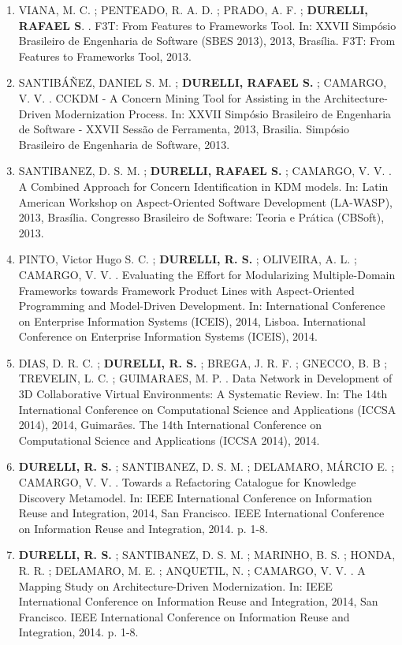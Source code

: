 \documentclass[12pt]{article}
\begin{document}
\begin{itemize}
\begin{enumerate}
		\item VIANA, M. C. ; PENTEADO, R. A. D. ; PRADO, A. F. ; \textbf{DURELLI, RAFAEL S}. . F3T: From Features to Frameworks Tool. In: XXVII Simpósio Brasileiro de Engenharia de Software (SBES 2013), 2013, Brasília. F3T: From Features to Frameworks Tool, 2013.
		
		\item SANTIBÁÑEZ, DANIEL S. M. ; \textbf{DURELLI, RAFAEL S.} ; CAMARGO, V. V. . CCKDM - A Concern Mining Tool for Assisting in the Architecture-Driven Modernization Process. In: XXVII Simpósio Brasileiro de Engenharia de Software - XXVII Sessão de Ferramenta, 2013, Brasilia. Simpósio Brasileiro de Engenharia de Software, 2013.
		
		\item SANTIBANEZ, D. S. M. ; \textbf{DURELLI, RAFAEL S.} ; CAMARGO, V. V. . A Combined Approach for Concern Identification in KDM models. In: Latin American Workshop on Aspect-Oriented Software Development (LA-WASP), 2013, Brasília. Congresso Brasileiro de Software: Teoria e Prática (CBSoft), 2013.
		
		\item PINTO, Victor Hugo S. C. ; \textbf{DURELLI, R. S.} ; OLIVEIRA, A. L. ; CAMARGO, V. V. . Evaluating the Effort for Modularizing Multiple-Domain Frameworks towards Framework Product Lines with Aspect-Oriented Programming and Model-Driven Development. In: International Conference on Enterprise Information Systems (ICEIS), 2014, Lisboa. International Conference on Enterprise Information Systems (ICEIS), 2014.
		
		\item DIAS, D. R. C. ; \textbf{DURELLI, R. S.} ; BREGA, J. R. F. ; GNECCO, B. B ; TREVELIN, L. C. ; GUIMARAES, M. P. . Data Network in Development of 3D Collaborative Virtual Environments: A Systematic Review. In: The 14th International Conference on Computational Science and Applications (ICCSA 2014), 2014, Guimarães. The 14th International Conference on Computational Science and Applications (ICCSA 2014), 2014.
		
		\item \textbf{DURELLI, R. S.} ; SANTIBANEZ, D. S. M. ; DELAMARO, MÁRCIO E. ; CAMARGO, V. V. . Towards a Refactoring Catalogue for Knowledge Discovery Metamodel. In: IEEE International Conference on Information Reuse and Integration, 2014, San Francisco. IEEE International Conference on Information Reuse and Integration, 2014. p. 1-8.
		
		\item \textbf{DURELLI, R. S.} ; SANTIBANEZ, D. S. M. ; MARINHO, B. S. ; HONDA, R. R. ; DELAMARO, M. E. ; ANQUETIL, N. ; CAMARGO, V. V. . A Mapping Study on Architecture-Driven Modernization. In: IEEE International Conference on Information Reuse and Integration, 2014, San Francisco. IEEE International Conference on Information Reuse and Integration, 2014. p. 1-8.
		

\end{enumerate}
\end{itemize}
\end{document}
